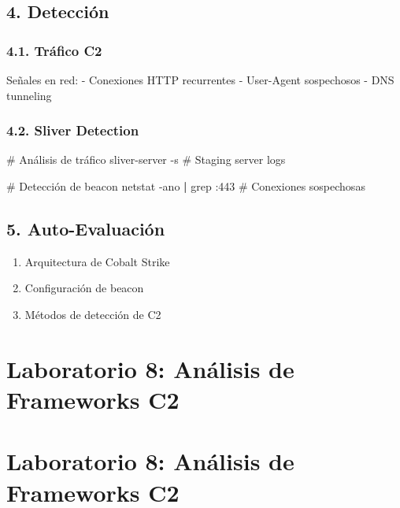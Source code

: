 \documentclass[
  letterpaper,
]{report}
\newenvironment{Shaded}{\begin{snugshade}}{\end{snugshade}}
\newcommand{\AttributeTok}[1]{\textcolor[rgb]{0.40,0.45,0.13}{#1}}
\newcommand{\CommentTok}[1]{\textcolor[rgb]{0.37,0.37,0.37}{#1}}
\newcommand{\ExtensionTok}[1]{\textcolor[rgb]{0.00,0.23,0.31}{#1}}
\newcommand{\FunctionTok}[1]{\textcolor[rgb]{0.28,0.35,0.67}{#1}}
\newcommand{\KeywordTok}[1]{\textcolor[rgb]{0.00,0.23,0.31}{\textbf{#1}}}
\newcommand{\NormalTok}[1]{\textcolor[rgb]{0.00,0.23,0.31}{#1}}
\providecommand{\tightlist}{%
  \setlength{\itemsep}{0pt}\setlength{\parskip}{0pt}}
\begin{document}
\section{4. Detección}\label{detecciuxf3n}

\subsection{4.1. Tráfico C2}\label{truxe1fico-c2}

Señales en red: - Conexiones HTTP recurrentes - User-Agent sospechosos -
DNS tunneling

\subsection{4.2. Sliver Detection}\label{sliver-detection}

\begin{Shaded}
\begin{Highlighting}[]
\CommentTok{\# Análisis de tráfico}
\ExtensionTok{sliver{-}server} \AttributeTok{{-}s}  \CommentTok{\# Staging server logs}

\CommentTok{\# Detección de beacon}
\FunctionTok{netstat} \AttributeTok{{-}ano} \KeywordTok{|} \FunctionTok{grep}\NormalTok{ :443  }\CommentTok{\# Conexiones sospechosas}
\end{Highlighting}
\end{Shaded}

\section{5. Auto-Evaluación}\label{auto-evaluaciuxf3n-7}

\begin{enumerate}
\def\labelenumi{\arabic{enumi}.}
\tightlist
\item
  Arquitectura de Cobalt Strike
\item
  Configuración de beacon
\item
  Métodos de detección de C2
\end{enumerate}

\chapter{Laboratorio 8: Análisis de Frameworks
C2}\label{laboratorio-8-anuxe1lisis-de-frameworks-c2}

\chapter{Laboratorio 8: Análisis de Frameworks
C2}\label{laboratorio-8-anuxe1lisis-de-frameworks-c2-1}
\end{document}
